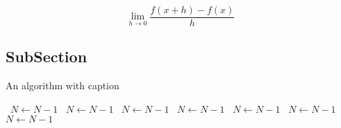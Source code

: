 \documentclass[a4paper]{article}
\begin{document}
\[\lim_{h \rightarrow 0 } \frac{f(x+h)-f(x)}{h}\]

\subsection{SubSection}

\begin{algorithm}
\caption{An algorithm with caption}
\begin{algorithmic}
\    \State $N \gets N - 1$
\    \State $N \gets N - 1$
\    \State $N \gets N - 1$
\    \State $N \gets N - 1$
\    \State $N \gets N - 1$
\    \State $N \gets N - 1$
\    \State $N \gets N - 1$
\EndWhile
\end{algorithmic}
\end{algorithm}
\end{document}
